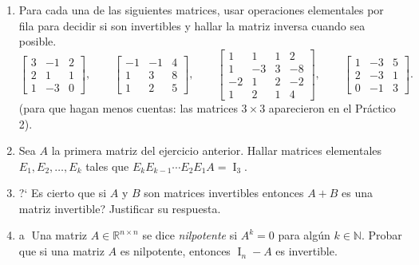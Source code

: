 \begin{enumerate}[topsep=6pt,itemsep=.4cm]


\item\label{ej:inversas} Para cada una de las siguientes matrices, usar operaciones elementales
por fila para decidir si son invertibles y hallar la matriz inversa cuando sea posible.
\begin{equation*}
\begin{bmatrix} 3 & -1 & 2 \\ 2 & 1 & 1 \\ 1 & -3 & 0\end{bmatrix},\qquad
\begin{bmatrix} -1 & -1 &4 \\ 1 & 3 & 8 \\ 1 & 2 & 5\end{bmatrix},\qquad
\begin{bmatrix} 1 & 1 & 1 & 2 \\ 1 & -3 & 3 & -8 \\ -2 & 1 & 2 & -2 \\ 1 & 2 & 1 & 4 \end{bmatrix},\qquad
\begin{bmatrix} 1 & -3 & 5 \\ 2 & -3 & 1 \\ 0 & -1 & 3 \end{bmatrix}.
\end{equation*}
(para que hagan menos cuentas: las matrices $3\times3$ aparecieron en el Práctico 2).


\item Sea $A$ la primera matriz del ejercicio anterior.
Hallar matrices elementales $E_1,E_2,\dots,E_k$ tales que $E_kE_{k-1}\cdots E_2E_1A=\operatorname{I}_3$.


\item ?` Es cierto que si $A$ y $B$ son matrices invertibles entonces $A+B$ es una matriz invertible? Justificar su respuesta.

\item\label{nilpotene - id} \textcircled{a} Una matriz $A\in\mathbb{R}^{n\times n}$ se dice \emph{nilpotente} si $A^k=0$ para algún $k\in\mathbb{N}$.
Probar que si una matriz $A$ es nilpotente, entonces  $\operatorname{I}_n - A$  es invertible.



\end{enumerate}
